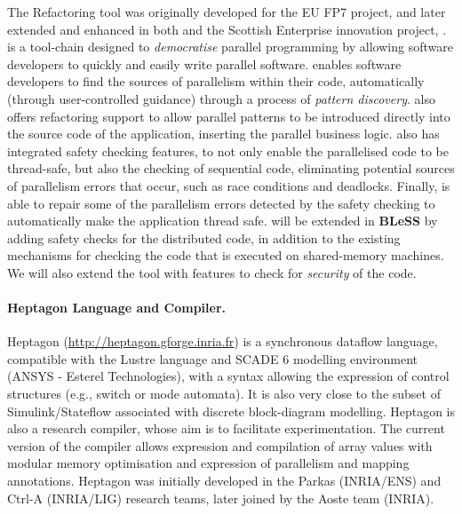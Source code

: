 \documentclass[a4paper,11pt]{article}
\newcommand{\project}[1]{\textbf{#1}\xspace}
\newcommand{\BLESS}{\project{BLeSS}}
\newcommand{\TheProject}{\BLESS}
\begin{document}
The \paraformance Refactoring tool was originally developed for the EU FP7 \ParaPhrase{} project, and later extended and enhanced in both \RePhrase{} and the Scottish Enterprise innovation project, \ParaFormance{}. 
\paraformance is a tool-chain designed to \emph{democratise} parallel programming by allowing software developers to quickly and easily write parallel software. \paraformance enables software developers to find the sources of parallelism within their code, automatically (through user-controlled guidance) through a process of \emph{pattern discovery}. \paraformance also offers refactoring support to allow parallel patterns to be introduced directly into the source code of the application, inserting the parallel business logic. \paraformance also has integrated safety checking features, to not only enable  the parallelised code to be thread-safe, but also the checking of sequential code, eliminating potential sources of parallelism errors that occur, such as race conditions and deadlocks. Finally, \paraformance is able to repair some of the parallelism errors detected by the safety checking to automatically make the application thread safe. \paraformance will be extended in \TheProject{} by adding safety checks for the distributed code, in addition to the existing mechanisms for checking the code that is executed on shared-memory machines. We will also extend the tool with features to check for \emph{security} of the code. 

\paragraph{\INRIA{} Heptagon Language and Compiler.}
Heptagon (\url{http://heptagon.gforge.inria.fr}) is a
synchronous dataflow language, compatible with the Lustre
language and SCADE 6 modelling environment (ANSYS - Esterel
Technologies), with a syntax allowing the expression of 
control structures (e.g., switch or mode automata).
It is also very close to the subset of Simulink/Stateflow 
associated with discrete block-diagram modelling.
Heptagon is also a research compiler, whose aim is to facilitate 
experimentation. The current version of the compiler 
allows expression and compilation of array values with modular
memory optimisation and expression of parallelism and mapping 
annotations. 
Heptagon was initially developed in the Parkas (INRIA/ENS) and Ctrl-A 
(INRIA/LIG) research teams, later joined by the Aoste team (INRIA).
\end{document}
